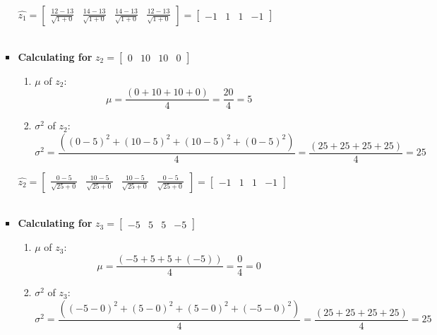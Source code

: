 \documentclass[11pt]{article}
\begin{document}
\begin{enumerate}
\begin{enumerate}
\begin{itemize}
        $\hat{z_1} = \begin{bmatrix}
            \frac{12-13}{\sqrt{1+0}}&\frac{14-13}{\sqrt{1+0}}&\frac{14-13}{\sqrt{1+0}}&\frac{12-13}{\sqrt{1+0}}\end{bmatrix} = \begin{bmatrix}
                -1&1&1&-1
            \end{bmatrix}$\\\\

        \item \textbf{Calculating for} $z_2 = \begin{bmatrix}
            0&10&10&0
        \end{bmatrix}$

        \begin{enumerate}
            \item $\mu$ of $z_2$:
            \[\mu = \frac{(0 + 10 + 10 + 0)}{4} = \frac{20}{4} = 5\]

            \item $\sigma^2$ of $z_2$:
            \[\sigma^2 = \frac{((0-5)^2+(10-5)^2+(10-5)^2+(0-5)^2)}{4} = \frac{(25 + 25 + 25 + 25)}{4} = 25\]
        \end{enumerate}

        $\hat{z_2} = \begin{bmatrix}
            \frac{0-5}{\sqrt{25+0}}&\frac{10-5}{\sqrt{25+0}}&\frac{10-5}{\sqrt{25+0}}&\frac{0-5}{\sqrt{25+0}}\end{bmatrix} = \begin{bmatrix}
                -1&1&1&-1
            \end{bmatrix}$\\\\

        \item \textbf{Calculating for} $z_3 = \begin{bmatrix}
            -5&5&5&-5
        \end{bmatrix}$

        \begin{enumerate}
            \item $\mu$ of $z_3$:
            \[\mu = \frac{(-5 + 5 + 5 + (-5))}{4} = \frac{0}{4} = 0\]

            \item $\sigma^2$ of $z_3$:
            \[\sigma^2 = \frac{((-5-0)^2+(5-0)^2+(5-0)^2+(-5-0)^2)}{4} = \frac{(25 + 25 + 25 + 25)}{4} = 25\]
        \end{enumerate}


\end{itemize}
\end{enumerate}
\end{enumerate}
\end{document}
